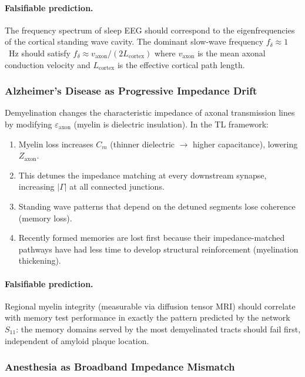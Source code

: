 \paragraph{Falsifiable prediction.}
The frequency spectrum of sleep EEG should correspond to
the eigenfrequencies of the cortical standing wave cavity.
The dominant slow-wave frequency $f_\delta \approx 1$~Hz
should satisfy $f_\delta \approx v_\text{axon} / (2L_\text{cortex})$
where $v_\text{axon}$ is the mean axonal conduction velocity
and $L_\text{cortex}$ is the effective cortical path length.

\subsubsection{Alzheimer's Disease as Progressive Impedance Drift}
\label{sec:alzheimers}

Demyelination changes the characteristic impedance of axonal
transmission lines by modifying $\varepsilon_\text{axon}$
(myelin is dielectric insulation).  In the TL framework:

\begin{enumerate}
    \item Myelin loss increases $C_m$ (thinner dielectric
          $\to$ higher capacitance), lowering $Z_\text{axon}$.
    \item This detunes the impedance matching at every
          downstream synapse, increasing $|\Gamma|$ at all
          connected junctions.
    \item Standing wave patterns that depend on the detuned
          segments lose coherence (memory loss).
    \item Recently formed memories are lost first because
          their impedance-matched pathways have had less
          time to develop structural reinforcement
          (myelination thickening).
\end{enumerate}

\paragraph{Falsifiable prediction.}
Regional myelin integrity (measurable via diffusion tensor
MRI) should correlate with memory test performance in
exactly the pattern predicted by the network $S_{11}$: the
memory domains served by the most demyelinated tracts should
fail first, independent of amyloid plaque location.

\subsubsection{Anesthesia as Broadband Impedance Mismatch}
\label{sec:anesthesia}

